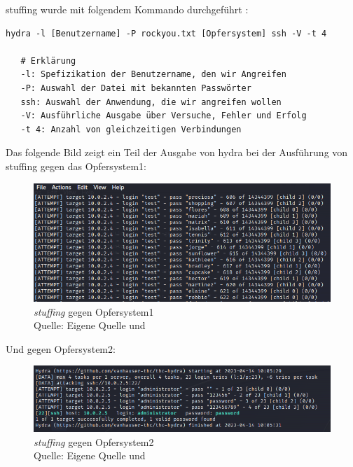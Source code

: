 \gls{stuffing} wurde mit folgendem Kommando durchgeführt \citep{kali_hydra}:
{
\begin{Verbatim}[frame=single]
   hydra -l [Benutzername] -P rockyou.txt [Opfersystem] ssh -V -t 4

   # Erklärung
   -l: Spefizikation der Benutzername, den wir Angreifen
   -P: Auswahl der Datei mit bekannten Passwörter
   ssh: Auswahl der Anwendung, die wir angreifen wollen
   -V: Ausführliche Ausgabe über Versuche, Fehler und Erfolg
   -t 4: Anzahl von gleichzeitigen Verbindungen
\end{Verbatim}
}

Das folgende Bild zeigt ein Teil der Ausgabe von \gls{hydra} bei der Ausführung von \gls{stuffing} gegen das Opfersystem1:
\begin{figure}[H]
   \centering
   \includegraphics[width=1\textwidth]{assets/stuffing_kali.png}
   \caption{\textit{\gls{stuffing}} gegen Opfersystem1\\Quelle: Eigene Quelle und \citep{Nguyen_stuffing}}
   \centering
\end{figure}

Und gegen Opfersystem2:
\begin{figure}[H]
   \centering
   \includegraphics[width=1\textwidth]{assets/stuffing_kali2.png}
   \caption{\textit{\gls{stuffing}} gegen Opfersystem2\\Quelle: Eigene Quelle und \citep{Nguyen_stuffing}}
   \centering
\end{figure}

